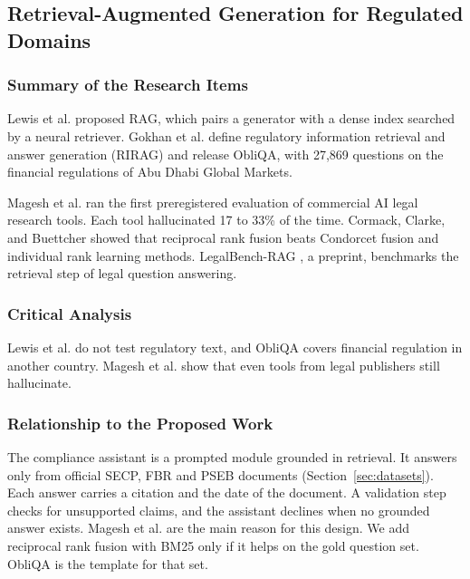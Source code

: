 \documentclass{FastFyp}
\begin{document}
\subsection{Retrieval-Augmented Generation for Regulated Domains}

\subsubsection{Summary of the Research Items}
Lewis et al. \cite{ref:lewis2020rag} proposed RAG, which pairs a generator with a dense index searched by a neural retriever. Gokhan et al. \cite{ref:gokhan2024rirag} define regulatory information retrieval and answer generation (RIRAG) and release ObliQA, with 27,869 questions on the financial regulations of Abu Dhabi Global Markets.

Magesh et al. \cite{ref:magesh2025} ran the first preregistered evaluation of commercial AI legal research tools. Each tool hallucinated 17 to 33\% of the time. Cormack, Clarke, and Buettcher \cite{ref:cormack2009rrf} showed that reciprocal rank fusion beats Condorcet fusion and individual rank learning methods. LegalBench-RAG \cite{ref:pipitone2024legalbench}, a preprint, benchmarks the retrieval step of legal question answering.

\subsubsection{Critical Analysis}
Lewis et al. do not test regulatory text, and ObliQA covers financial regulation in another country. Magesh et al. show that even tools from legal publishers still hallucinate.

\subsubsection{Relationship to the Proposed Work}
The compliance assistant is a prompted module grounded in retrieval. It answers only from official SECP, FBR and PSEB documents (Section~\ref{sec:datasets}). Each answer carries a citation and the date of the document. A validation step checks for unsupported claims, and the assistant declines when no grounded answer exists. Magesh et al. are the main reason for this design. We add reciprocal rank fusion with BM25 only if it helps on the gold question set. ObliQA is the template for that set.
\end{document}
